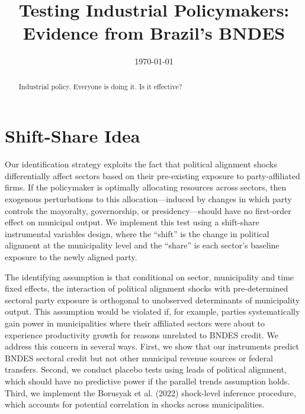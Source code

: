 \documentclass{article}
\begin{document}
\title{Testing Industrial Policymakers: Evidence from Brazil's BNDES}
\author{}
\date{\today}

\maketitle

\begin{abstract}
    Industrial policy. Everyone is doing it. Is it effective?
\end{abstract}

\normalsize

\newpage
\clearpage
\setcounter{page}{1}
\setlength{\parskip}{10pt}
\setlength{\parindent}{10pt}

\section{Shift-Share Idea}

Our identification strategy exploits the fact that political alignment shocks differentially affect sectors based on their pre-existing exposure to party-affiliated firms. If the policymaker is optimally allocating resources across sectors, then exogenous perturbations to this allocation---induced by changes in which party controls the mayoralty, governorship, or presidency---should have no first-order effect on municipal output. We implement this test using a shift-share instrumental variables design, where the ``shift'' is the change in political alignment at the municipality level and the ``share'' is each sector's baseline exposure to the newly aligned party.

The identifying assumption is that conditional on sector, municipality and time fixed effects, the interaction of political alignment shocks with pre-determined sectoral party exposure is orthogonal to unobserved determinants of municipality output. This assumption would be violated if, for example, parties systematically gain power in municipalities where their affiliated sectors were about to experience productivity growth for reasons unrelated to BNDES credit. We address this concern in several ways. First, we show that our instruments predict BNDES sectoral credit but not other municipal revenue sources or federal transfers. Second, we conduct placebo tests using leads of political alignment, which should have no predictive power if the parallel trends assumption holds. Third, we implement the Borusyak et al. (2022) shock-level inference procedure, which accounts for potential correlation in shocks across municipalities.
\end{document}
